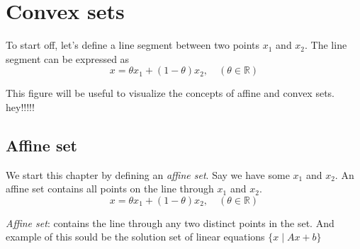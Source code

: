
\chapter{Convex sets}


To start off, let's define a line segment between two points $x_1$ and $x_2$. The line segment can be expressed as
\[
    x = \theta x_1 + (1 - \theta) x_2, \quad (\theta \in \mathbb{R})
\]

\begin{figure}[hbpt!]
    \vspace{0.25cm}
    \centering
\end{figure}
This figure will be useful to visualize the concepts of affine and convex sets. hey!!!!!

\section{Affine set}
We start this chapter by defining an \textit{affine set}. Say we have some $x_1$ and $x_2$. An affine set contains all points on the line through $x_1$ and $x_2$.
\[
    x = \theta x_1 + (1 - \theta) x_2, \quad (\theta \in \mathbb{R})
\]


\textit{Affine set}: contains the line through any two distinct points in the set. And example of this sould
be the solution set of linear equations $\{x \mid Ax + b\}$


